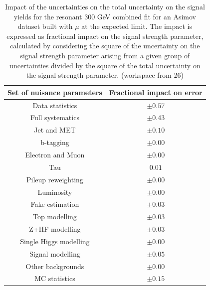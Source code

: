 \begin{table}
\centering
\begin{tabular}{|c|c|}
\hline
Set of nuisance parameters & Fractional impact on error\\
\hline
Data statistics & $\pm 0.57$\\
Full systematics & $\pm 0.43$\\
Jet and MET & $\pm 0.10$ \\
b-tagging & $\pm 0.00$\\
Electron and Muon & $\pm 0.00$\\
Tau & $0.01$\\
Pileup reweighting & $\pm 0.00$\\
Luminosity & $\pm 0.00$\\
Fake estimation & $\pm 0.03$\\
Top modelling & $\pm 0.03$\\ 
Z+HF modelling & $\pm 0.03$\\
Single Higgs modelling & $\pm 0.00$\\
Signal modelling & $\pm 0.05$\\
Other backgrounds & $\pm 0.00$\\
MC statistics & $\pm 0.15$\\
\hline
\end{tabular}
\caption{Impact of the uncertainties on the total uncertainty on the signal yields for the resonant 300 GeV combined fit for an Asimov dataset built with $\mu$ at the expected limit. The impact is expressed as fractional impact on the signal strength parameter,  calculated by considering the square of the uncertainty on the signal strength parameter arising from a given group of uncertainties divided by the square of the total uncertainty on the signal strength parameter.  (workspace from 26)}
\label{sec:fit:tab:CombBreakdown2HDM300Asimov}
\end{table}

